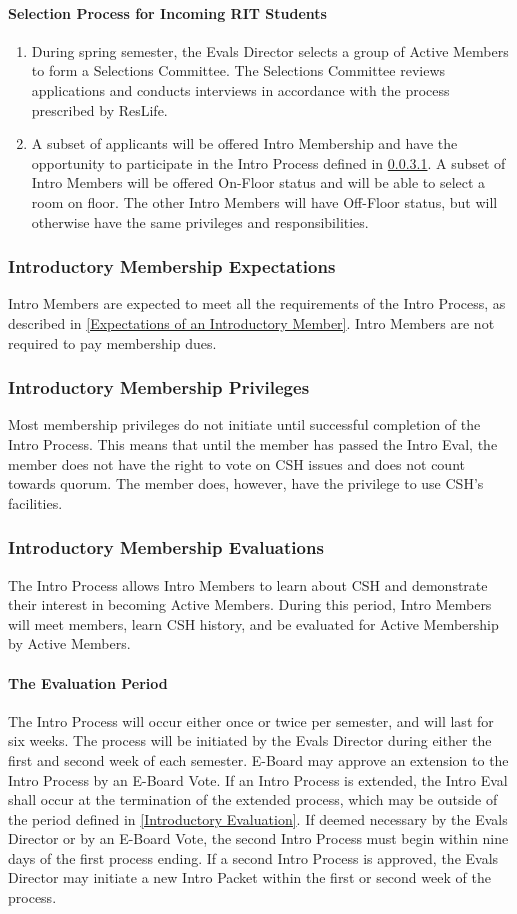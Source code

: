 \documentclass{article}
\newcommand{\asubsection}[1]{\subsubsection{#1} \label{#1}}
\newcommand{\asubsubsection}[1]{\paragraph{#1} \label{#1}}
\begin{document}
\asubsubsection{Selection Process for Incoming RIT Students}
\begin{enumerate}
	\item During spring semester, the Evals Director selects a group of Active Members to form a Selections Committee.
	      The Selections Committee reviews applications and conducts interviews in accordance with the process prescribed by ResLife.
	\item A subset of applicants will be offered Intro Membership and have the opportunity to participate in the Intro Process defined in \ref{The Evaluation Period}.
	      A subset of Intro Members will be offered On-Floor status and will be able to select a room on floor.
	      The other Intro Members will have Off-Floor status, but will otherwise have the same privileges and responsibilities.
\end{enumerate}

\asubsection{Introductory Membership Expectations}
Intro Members are expected to meet all the requirements of the Intro Process, as described in \ref{Expectations of an Introductory Member}.
Intro Members are not required to pay membership dues.

\asubsection{Introductory Membership Privileges}
Most membership privileges do not initiate until successful completion of the Intro Process.
This means that until the member has passed the Intro Eval, the member does not have the right to vote on CSH issues and does not count towards quorum.
The member does, however, have the privilege to use CSH's facilities.

\asubsection{Introductory Membership Evaluations}
The Intro Process allows Intro Members to learn about CSH and demonstrate their interest in becoming Active Members. During this period, Intro Members will meet members, learn CSH history, and be evaluated for Active Membership by Active Members.

\asubsubsection{The Evaluation Period}
The Intro Process will occur either once or twice per semester, and will last for six weeks.
The process will be initiated by the Evals Director during either the first and second week of each semester. E-Board may approve an extension to the Intro Process by an E-Board Vote.
If an Intro Process is extended, the Intro Eval shall occur at the termination of the extended process, which may be outside of the period defined in \ref{Introductory Evaluation}.
If deemed necessary by the Evals Director or by an E-Board Vote, the second Intro Process must begin within nine days of the first process ending.
If a second Intro Process is approved, the Evals Director may initiate a new Intro Packet within the first or second week of the process.
\end{document}

